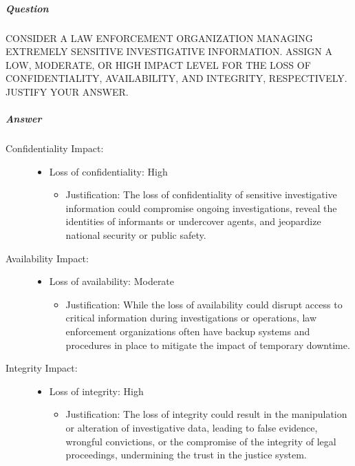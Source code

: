 \documentclass{article}
\begin{document}
                        \subparagraph{Question}
                        CONSIDER A LAW ENFORCEMENT ORGANIZATION MANAGING EXTREMELY
                        SENSITIVE INVESTIGATIVE INFORMATION.
                        ASSIGN A LOW, MODERATE, OR HIGH IMPACT LEVEL FOR THE LOSS OF
                        CONFIDENTIALITY, AVAILABILITY, AND INTEGRITY, RESPECTIVELY.
                        JUSTIFY YOUR ANSWER.
                        \subparagraph{Answer}
                        \begin{description}
                            \item[Confidentiality Impact:]
                        \begin{itemize}
                            \item Loss of confidentiality: High
                            \begin{itemize}
                                \item Justification: The loss of confidentiality of sensitive investigative information could compromise ongoing investigations, reveal the identities of informants or undercover agents, and jeopardize national security or public safety.
                            \end{itemize}
                        \end{itemize}

                        \item[Availability Impact:]
                        \begin{itemize}
                            \item Loss of availability: Moderate
                            \begin{itemize}
                                \item Justification: While the loss of availability could disrupt access to critical information during investigations or operations, law enforcement organizations often have backup systems and procedures in place to mitigate the impact of temporary downtime.
                            \end{itemize}
                        \end{itemize}

                        \item[Integrity Impact:]
                        \begin{itemize}
                            \item Loss of integrity: High
                            \begin{itemize}
                                \item Justification: The loss of integrity could result in the manipulation or alteration of investigative data, leading to false evidence, wrongful convictions, or the compromise of the integrity of legal proceedings, undermining the trust in the justice system.
                            \end{itemize}
                        \end{itemize}

                    \end{description}
        \newpage
\end{document}
